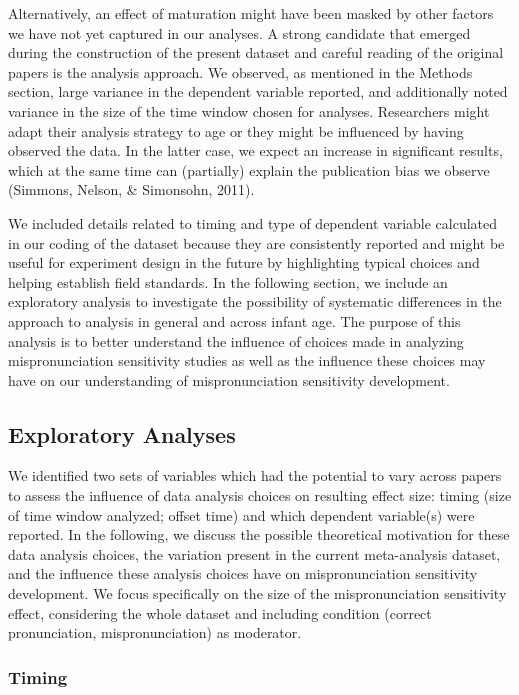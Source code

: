 \documentclass[man]{apa6}
\theoremstyle{definition}
\theoremstyle{definition}
\theoremstyle{definition}
\theoremstyle{remark}
\begin{document}
Alternatively, an effect of maturation might have been masked by other
factors we have not yet captured in our analyses. A strong candidate
that emerged during the construction of the present dataset and careful
reading of the original papers is the analysis approach. We observed, as
mentioned in the Methods section, large variance in the dependent
variable reported, and additionally noted variance in the size of the
time window chosen for analyses. Researchers might adapt their analysis
strategy to age or they might be influenced by having observed the data.
In the latter case, we expect an increase in significant results, which
at the same time can (partially) explain the publication bias we observe
(Simmons, Nelson, \& Simonsohn, 2011).

We included details related to timing and type of dependent variable
calculated in our coding of the dataset because they are consistently
reported and might be useful for experiment design in the future by
highlighting typical choices and helping establish field standards. In
the following section, we include an exploratory analysis to investigate
the possibility of systematic differences in the approach to analysis in
general and across infant age. The purpose of this analysis is to better
understand the influence of choices made in analyzing mispronunciation
sensitivity studies as well as the influence these choices may have on
our understanding of mispronunciation sensitivity development.

\subsection{Exploratory Analyses}\label{exploratory-analyses}

We identified two sets of variables which had the potential to vary
across papers to assess the influence of data analysis choices on
resulting effect size: timing (size of time window analyzed; offset
time) and which dependent variable(s) were reported. In the following,
we discuss the possible theoretical motivation for these data analysis
choices, the variation present in the current meta-analysis dataset, and
the influence these analysis choices have on mispronunciation
sensitivity development. We focus specifically on the size of the
mispronunciation sensitivity effect, considering the whole dataset and
including condition (correct pronunciation, mispronunciation) as
moderator.

\subsubsection{Timing}\label{timing}
\end{document}
